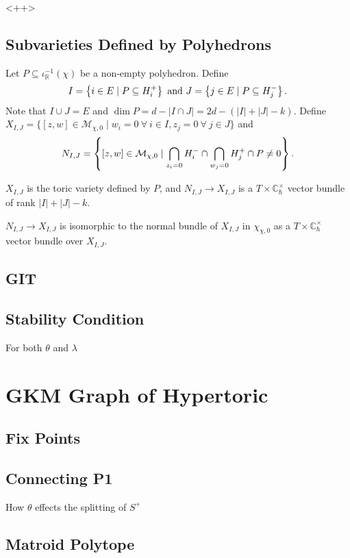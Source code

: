 \documentclass[b5paper]{article}
\newcommand{\MM}{\mathcal{M}}
\newcommand{\Chbar}{\mathbb{C}^\times _\hbar}
\begin{document}
<++>

\subsection{Subvarieties Defined by Polyhedrons}

Let $P\subseteq \iota^{-1}_\mathbb{R}(\chi)$ be a non-empty polyhedron. Define
\[
  I=\left\{i\in E\mid P\subseteq H_i^+\right\}
  \textnormal{ and }
  J=\left\{j\in E\mid P\subseteq H_j^-\right\}.
\]
Note that $I\cup J=E$ and $\dim P=d-|I\cap J|=2d-(|I|+|J|-k)$.
Define $X_{I,J}=\{[z,w]\in \MM_{\chi,0}\mid w_i=0\ \forall\ i\in I, z_j=0\ \forall\ j\in J\}$ and
\[
  N_{I,J}=\CB{[z,w]\in \MM_{\chi,0}\mid \bigcap_{z_i=0}H_i^-\cap \bigcap_{w_j=0}H_j^+\cap P\neq 0}.
\]
\begin{proposition}[pps:]{}
  $X_{I,J}$ is the toric variety defined by $P$, and $N_{I,J}\rightarrow X_{I,J}$ is a $T\times \Chbar$ vector bundle of rank $|I|+|J|-k$.
\end{proposition}

\begin{theorem}[thm:]{}
  $N_{I,J}\rightarrow X_{I,J}$ is isomorphic to the normal bundle of $X_{I,J}$ in $\chi_{\chi,0}$ as a $T\times \Chbar$ vector bundle over $X_{I,J}$.
\end{theorem}





\subsection{GIT}
\subsection{Stability Condition}
For both $\theta$ and $\lambda$
\section{GKM Graph of Hypertoric}
\subsection{Fix Points}
\subsection{Connecting P1}
How $\theta$ effects the splitting of $S^+$
\subsection{Matroid Polytope}
\end{document}
